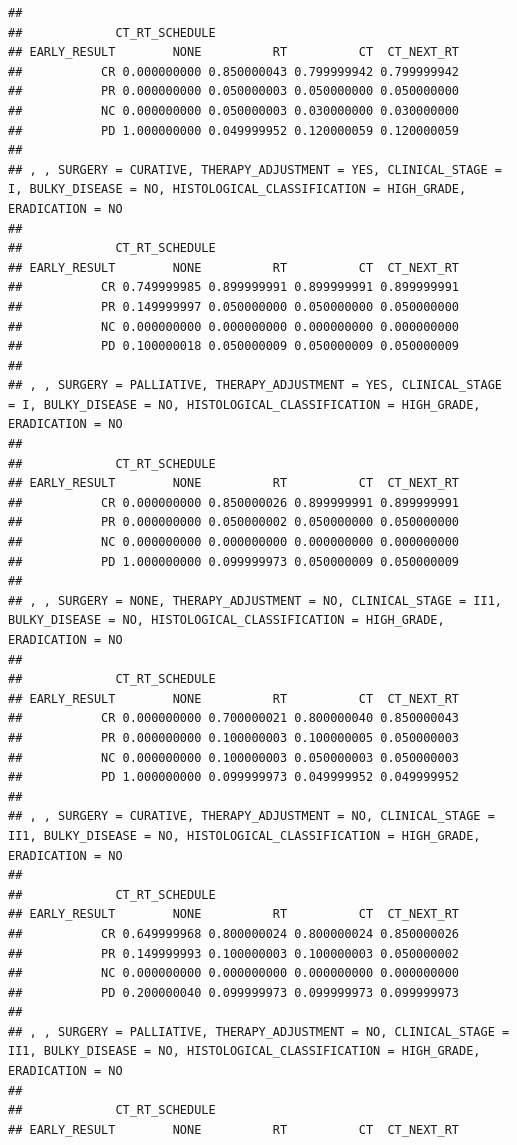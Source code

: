 \documentclass[]{article}
\begin{document}
\begin{verbatim}
## 
##             CT_RT_SCHEDULE
## EARLY_RESULT        NONE          RT          CT  CT_NEXT_RT
##           CR 0.000000000 0.850000043 0.799999942 0.799999942
##           PR 0.000000000 0.050000003 0.050000000 0.050000000
##           NC 0.000000000 0.050000003 0.030000000 0.030000000
##           PD 1.000000000 0.049999952 0.120000059 0.120000059
## 
## , , SURGERY = CURATIVE, THERAPY_ADJUSTMENT = YES, CLINICAL_STAGE = I, BULKY_DISEASE = NO, HISTOLOGICAL_CLASSIFICATION = HIGH_GRADE, ERADICATION = NO
## 
##             CT_RT_SCHEDULE
## EARLY_RESULT        NONE          RT          CT  CT_NEXT_RT
##           CR 0.749999985 0.899999991 0.899999991 0.899999991
##           PR 0.149999997 0.050000000 0.050000000 0.050000000
##           NC 0.000000000 0.000000000 0.000000000 0.000000000
##           PD 0.100000018 0.050000009 0.050000009 0.050000009
## 
## , , SURGERY = PALLIATIVE, THERAPY_ADJUSTMENT = YES, CLINICAL_STAGE = I, BULKY_DISEASE = NO, HISTOLOGICAL_CLASSIFICATION = HIGH_GRADE, ERADICATION = NO
## 
##             CT_RT_SCHEDULE
## EARLY_RESULT        NONE          RT          CT  CT_NEXT_RT
##           CR 0.000000000 0.850000026 0.899999991 0.899999991
##           PR 0.000000000 0.050000002 0.050000000 0.050000000
##           NC 0.000000000 0.000000000 0.000000000 0.000000000
##           PD 1.000000000 0.099999973 0.050000009 0.050000009
## 
## , , SURGERY = NONE, THERAPY_ADJUSTMENT = NO, CLINICAL_STAGE = II1, BULKY_DISEASE = NO, HISTOLOGICAL_CLASSIFICATION = HIGH_GRADE, ERADICATION = NO
## 
##             CT_RT_SCHEDULE
## EARLY_RESULT        NONE          RT          CT  CT_NEXT_RT
##           CR 0.000000000 0.700000021 0.800000040 0.850000043
##           PR 0.000000000 0.100000003 0.100000005 0.050000003
##           NC 0.000000000 0.100000003 0.050000003 0.050000003
##           PD 1.000000000 0.099999973 0.049999952 0.049999952
## 
## , , SURGERY = CURATIVE, THERAPY_ADJUSTMENT = NO, CLINICAL_STAGE = II1, BULKY_DISEASE = NO, HISTOLOGICAL_CLASSIFICATION = HIGH_GRADE, ERADICATION = NO
## 
##             CT_RT_SCHEDULE
## EARLY_RESULT        NONE          RT          CT  CT_NEXT_RT
##           CR 0.649999968 0.800000024 0.800000024 0.850000026
##           PR 0.149999993 0.100000003 0.100000003 0.050000002
##           NC 0.000000000 0.000000000 0.000000000 0.000000000
##           PD 0.200000040 0.099999973 0.099999973 0.099999973
## 
## , , SURGERY = PALLIATIVE, THERAPY_ADJUSTMENT = NO, CLINICAL_STAGE = II1, BULKY_DISEASE = NO, HISTOLOGICAL_CLASSIFICATION = HIGH_GRADE, ERADICATION = NO
## 
##             CT_RT_SCHEDULE
## EARLY_RESULT        NONE          RT          CT  CT_NEXT_RT

\end{verbatim}
\end{document}
